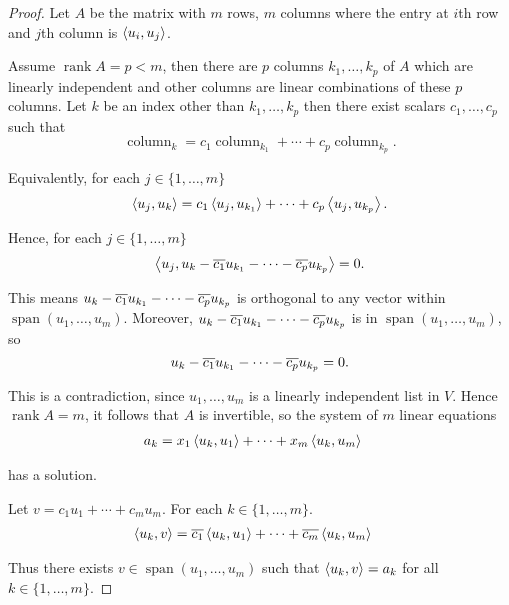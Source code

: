 \begin{proof}
    Let $A$ be the matrix with $m$ rows, $m$ columns where the entry at $i$th row and $j$th column is $\left\langle{u_{i}, u_{j}}\right\rangle$.

    Assume $\operatorname{rank} A = p < m$, then there are $p$ columns $k_{1}, \ldots, k_{p}$ of $A$ which are linearly independent and other columns are linear combinations of these $p$ columns. Let $k$ be an index other than $k_{1}, \ldots, k_{p}$ then there exist scalars $c_{1}, \ldots, c_{p}$ such that
    \[
        \operatorname{column}_{k} = c_{1}\operatorname{column}_{k_{1}} + \cdots + c_{p}\operatorname{column}_{k_{p}}.
    \]

    Equivalently, for each $j\in\{ 1,\ldots, m \}$
    \[
        \left\langle{u_{j}, u_{k}}\right\rangle = c_{1}\left\langle{u_{j}, u_{k_{1}}}\right\rangle + \cdots + c_{p}\left\langle{u_{j}, u_{k_{p}}}\right\rangle.
    \]

    Hence, for each $j\in\{ 1,\ldots, m \}$
    \[
        \left\langle{u_{j}, u_{k} - \overline{c_{1}}u_{k_{1}} - \cdots - \overline{c_{p}}u_{k_{p}}}\right\rangle = 0.
    \]

    This means $u_{k} - \overline{c_{1}}u_{k_{1}} - \cdots - \overline{c_{p}}u_{k_{p}}$ is orthogonal to any vector within $\operatorname{span}(u_{1}, \ldots, u_{m})$. Moreover, $u_{k} - \overline{c_{1}}u_{k_{1}} - \cdots - \overline{c_{p}}u_{k_{p}}$ is in $\operatorname{span}(u_{1}, \ldots, u_{m})$, so
    \[
        u_{k} - \overline{c_{1}}u_{k_{1}} - \cdots - \overline{c_{p}}u_{k_{p}} = 0.
    \]

    This is a contradiction, since $u_{1}, \ldots, u_{m}$ is a linearly independent list in $V$. Hence $\operatorname{rank} A = m$, it follows that $A$ is invertible, so the system of $m$ linear equations
    \begin{align*}
        a_{k} & = x_{1}\left\langle{u_{k}, u_{1}}\right\rangle + \cdots + x_{m}\left\langle{u_{k}, u_{m}}\right\rangle
    \end{align*}

    has a solution.

    Let $v = c_{1}u_{1} + \cdots + c_{m}u_{m}$. For each $k\in\{ 1,\ldots, m \}$.
    \begin{align*}
        \left\langle{u_{k}, v}\right\rangle & = \overline{c_{1}}\left\langle{u_{k}, u_{1}}\right\rangle + \cdots + \overline{c_{m}}\left\langle{u_{k}, u_{m}}\right\rangle
    \end{align*}

    Thus there exists $v\in \operatorname{span}(u_{1}, \ldots, u_{m})$ such that $\left\langle{u_{k}, v}\right\rangle = a_{k}$ for all $k\in \{ 1, \ldots, m \}$.
\end{proof}
\newpage

